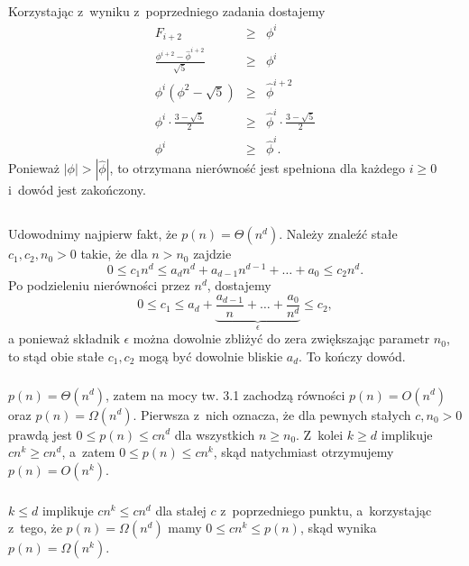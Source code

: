 \subsection{} %
Korzystając z~wyniku z~poprzedniego zadania dostajemy
\begin{eqnarray*}
	F_{i+2} &\ge& \phi^i \\
	\frac{\phi^{i+2}-\widehat\phi^{i+2}}{\sqrt{5}} &\ge& \phi^i \\
	\phi^i\left(\phi^2-\sqrt{5}\right) &\ge& \widehat\phi^{i+2} \\
	\phi^i\cdot\frac{3-\sqrt{5}}{2} &\ge& \widehat\phi^i\cdot\frac{3-\sqrt{5}}{2} \\
	\phi^i &\ge& \widehat\phi^i.
\end{eqnarray*}
Ponieważ $|\phi|>|\widehat\phi|$, to otrzymana nierówność jest spełniona dla każdego $i\ge 0$ i~dowód jest zakończony.

\problems

\subsection{} %
Udowodnimy najpierw fakt, że $p(n)=\Theta(n^d)$. Należy znaleźć stałe $c_1,c_2,n_0>0$ takie, że dla $n>n_0$ zajdzie
\[
	0\le c_1n^d\le a_dn^d+a_{d-1}n^{d-1}+\dots +a_0\le c_2n^d.
\]
Po podzieleniu nierówności przez $n^d$, dostajemy
\[
	0\le c_1\le a_d+\underbrace{\frac{a_{d-1}}{n}+\dots +\frac{a_0}{n^d}}_\epsilon\le c_2,
\]
a ponieważ składnik $\epsilon$ można dowolnie zbliżyć do zera zwiększając parametr $n_0$, to stąd obie stałe $c_1,c_2$ mogą być dowolnie bliskie $a_d$. To kończy dowód.

\subsubsection{} %
$p(n) = \Theta(n^d)$, zatem na mocy tw. 3.1 zachodzą równości $p(n) = O(n^d)$ oraz $p(n) = \Omega(n^d)$. Pierwsza z~nich oznacza, że dla pewnych stałych $c,n_0>0$ prawdą jest $0\le p(n)\le cn^d$ dla wszystkich $n\ge n_0$. Z~kolei $k\ge d$ implikuje $cn^k\ge cn^d$, a~zatem $0\le p(n)\le cn^k$, skąd natychmiast otrzymujemy $p(n) = O(n^k)$.

\subsubsection{} %
$k\le d$ implikuje $cn^k\le cn^d$ dla stałej $c$ z~poprzedniego punktu, a~korzystając z~tego, że $p(n) = \Omega(n^d)$ mamy $0\le cn^k\le p(n)$, skąd wynika $p(n)=\Omega(n^k)$.

